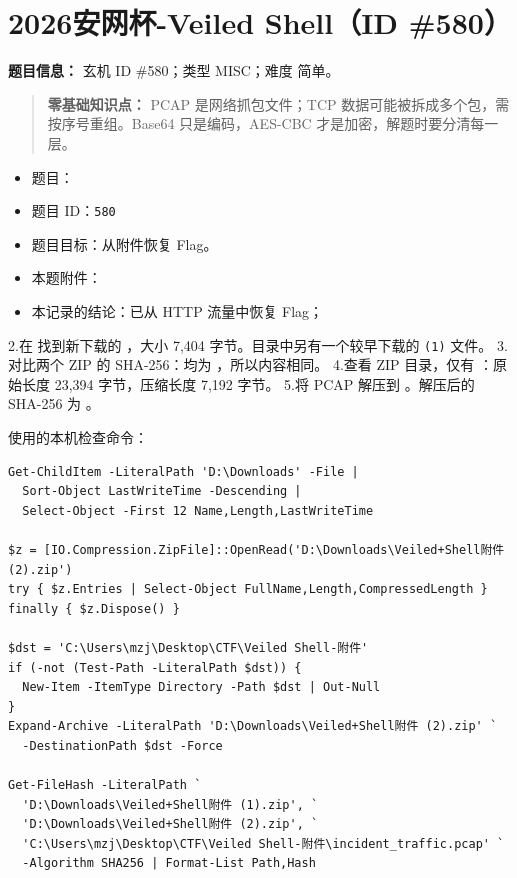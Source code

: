 \section{2026安网杯-Veiled Shell（ID \#580）}\label{ux5b89ux7f51ux676f-veiled-shellid-580}

\textbf{题目信息：} 玄机 ID \#580；类型 MISC；难度 简单。

\begin{quote}
\textbf{零基础知识点：} PCAP 是网络抓包文件；TCP 数据可能被拆成多个包，需按序号重组。Base64 只是编码，AES-CBC 才是加密，解题时要分清每一层。
\end{quote}

\begin{itemize}
\tightlist
\item
  题目：\texttt{}
\item
  题目 ID：\texttt{580}
\item
  题目目标：从附件恢复 Flag。
\item
  本题附件：\texttt{}
\item
  本记录的结论：已从 HTTP 流量中恢复 Flag；
\end{itemize}

2.在 \texttt{} 找到新下载的 \texttt{}，大小 7,404 字节。目录中另有一个较早下载的 \texttt{(1)} 文件。 3.对比两个 ZIP 的 SHA-256：均为 \texttt{}，所以内容相同。 4.查看 ZIP 目录，仅有 \texttt{}：原始长度 23,394 字节，压缩长度 7,192 字节。 5.将 PCAP 解压到 \texttt{}。解压后的 SHA-256 为 \texttt{}。

使用的本机检查命令：

\begin{verbatim}
Get-ChildItem -LiteralPath 'D:\Downloads' -File |
  Sort-Object LastWriteTime -Descending |
  Select-Object -First 12 Name,Length,LastWriteTime

$z = [IO.Compression.ZipFile]::OpenRead('D:\Downloads\Veiled+Shell附件 (2).zip')
try { $z.Entries | Select-Object FullName,Length,CompressedLength }
finally { $z.Dispose() }

$dst = 'C:\Users\mzj\Desktop\CTF\Veiled Shell-附件'
if (-not (Test-Path -LiteralPath $dst)) {
  New-Item -ItemType Directory -Path $dst | Out-Null
}
Expand-Archive -LiteralPath 'D:\Downloads\Veiled+Shell附件 (2).zip' `
  -DestinationPath $dst -Force

Get-FileHash -LiteralPath `
  'D:\Downloads\Veiled+Shell附件 (1).zip', `
  'D:\Downloads\Veiled+Shell附件 (2).zip', `
  'C:\Users\mzj\Desktop\CTF\Veiled Shell-附件\incident_traffic.pcap' `
  -Algorithm SHA256 | Format-List Path,Hash
\end{verbatim}

